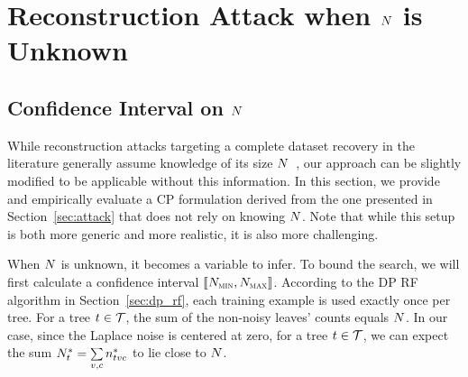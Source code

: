 \section{Reconstruction Attack when  $N$ is Unknown}\label{appendix:cp_model_n_unknown}

\subsection{Confidence Interval on $N$}

While reconstruction attacks targeting a complete dataset recovery in the literature generally assume knowledge of its size $N$~\cite{dwork2017exposed}, our approach can be slightly modified to be applicable without this information. In this section, we provide and empirically evaluate a CP formulation derived from the one presented in Section~\ref{sec:attack} that does not rely on knowing $N$. Note that while this setup is both more generic and more realistic, it is also more challenging.

When $N$ is unknown, it becomes a variable to infer. To bound the search, we will first calculate a confidence interval $\llbracket N_{\textsc{min}}, N_{\textsc{max}} \rrbracket$.
According to the DP RF algorithm in Section~\ref{sec:dp_rf}, each training example is used exactly once per tree. For a tree $t \in \mathcal{T}$, the sum of the non-noisy leaves' counts equals $N$.
In our case, since the Laplace noise is centered at zero, for a tree $t \in \mathcal{T}$, we can expect the sum $\nexamples_\tree^* = \smash{\sum\limits_{\node,\class} \nodesupport[\tree,\node,\class]^*}$ to lie close to $N$.

